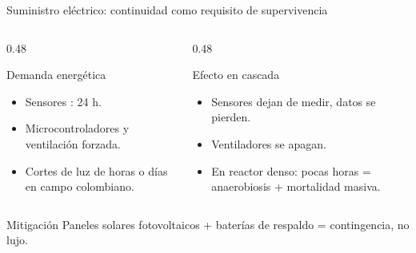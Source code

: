 \documentclass[aspectratio=169, 11pt]{beamer}
\newcommand{\NDIR}{\text{NDIR}}
\begin{document}
\begin{frame}{Suministro el\'{e}ctrico: continuidad como requisito de supervivencia}
    \begin{columns}[T]
        \begin{column}{0.48\textwidth}
            \begin{block}{Demanda energ\'{e}tica}
                \begin{itemize}
                    \item Sensores \NDIR{}: 24 h.
                    \item Microcontroladores y ventilaci\'{o}n forzada.
                    \item Cortes de luz de horas o d\'{i}as en campo colombiano.
                \end{itemize}
            \end{block}
        \end{column}
        \begin{column}{0.48\textwidth}
            \begin{alertblock}{Efecto en cascada}
                \begin{itemize}
                    \item Sensores dejan de medir, datos se pierden.
                    \item Ventiladores se apagan.
                    \item En reactor denso: pocas horas = anaerobiosis + mortalidad masiva.
                \end{itemize}
            \end{alertblock}
        \end{column}
    \end{columns}

    \vfill
    \begin{block}{Mitigaci\'{o}n}
        \centering
        Paneles solares fotovoltaicos + bater\'{i}as de respaldo = contingencia, no lujo.
    \end{block}
\end{frame}
\end{document}
